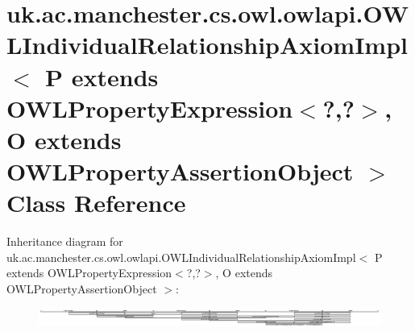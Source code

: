 \hypertarget{classuk_1_1ac_1_1manchester_1_1cs_1_1owl_1_1owlapi_1_1_o_w_l_individual_relationship_axiom_impl_2e65835829d24af56b0ce2178ea3b61b}{\section{uk.\-ac.\-manchester.\-cs.\-owl.\-owlapi.\-O\-W\-L\-Individual\-Relationship\-Axiom\-Impl$<$ P extends O\-W\-L\-Property\-Expression$<$?,?$>$, O extends O\-W\-L\-Property\-Assertion\-Object $>$ Class Reference}
\label{classuk_1_1ac_1_1manchester_1_1cs_1_1owl_1_1owlapi_1_1_o_w_l_individual_relationship_axiom_impl_2e65835829d24af56b0ce2178ea3b61b}
}
Inheritance diagram for uk.\-ac.\-manchester.\-cs.\-owl.\-owlapi.\-O\-W\-L\-Individual\-Relationship\-Axiom\-Impl$<$ P extends O\-W\-L\-Property\-Expression$<$?,?$>$, O extends O\-W\-L\-Property\-Assertion\-Object $>$\-:\begin{figure}[H]
\begin{center}
\leavevmode
\includegraphics[height=0.618785cm]{classuk_1_1ac_1_1manchester_1_1cs_1_1owl_1_1owlapi_1_1_o_w_l_individual_relationship_axiom_impl_2e65835829d24af56b0ce2178ea3b61b}
\end{center}
\end{figure}
